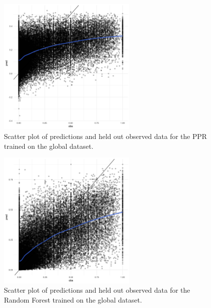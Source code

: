 \documentclass[review]{elsarticle}
\begin{document}
\begin{figure}[h!]
  \centering
  \includegraphics[width=0.6\textwidth]{figs/SI/ppr_obspred_global.png}
\caption{
  Scatter plot of predictions and held out observed data for the PPR trained on the global dataset.
}

\end{figure}


\begin{figure}[h!]
  \centering
  \includegraphics[width=0.6\textwidth]{figs/SI/ranger_obspred_global.png}
\caption{
  Scatter plot of predictions and held out observed data for the Random Forest trained on the global dataset.
}

\end{figure}
\end{document}
